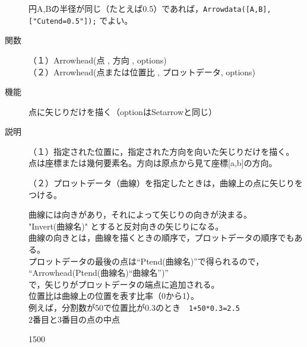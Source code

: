 \documentclass[papersize,a4paper,10pt,uplatex]{jsarticle}
\begin{document}
\begin{description}
円A,Bの半径が同じ（たとえば0.5）であれば，\verb|Arrowdata([A,B],["Cutend=0.5"]);| でよい。

\vspace{\baselineskip}
\hypertarget{arrowhead}{}
\item[関数]（１）Arrowhead(点 , 方向 , options)\\
（２）Arrowhead(点または位置比 , プロットデータ, options)
\item[機能]点に矢じりだけを描く（optionはSetarrowと同じ）
\item[説明]（１）指定された位置に，指定された方向を向いた矢じりだけを描く。\\
\hspace*{2.5zw}点は座標または幾何要素名。方向は原点から見て座標[a,b]の方向。


（２）プロットデータ（曲線）を指定したときは，曲線上の点に矢じりをつける。

\hspace*{2.5zw}曲線には向きがあり，それによって矢じりの向きが決まる。\\
\hspace*{2.5zw}"Invert(曲線名)" とすると反対向きの矢じりになる。\\
\hspace*{2.5zw}曲線の向きとは，曲線を描くときの順序で，プロットデータの順序でもある。\\
\hspace*{2.5zw}プロットデータの最後の点は``Ptend(曲線名)''で得られるので，
``Arrowhead(Ptend(曲線名)``曲線名'')''\\
\hspace*{2.5zw}で，矢じりがプロットデータの端点に追加される。\\
\hspace*{2.5zw}位置比は曲線上の位置を表す比率（0から1）。\\
\hspace*{3.5zw}例えば，分割数が50で位置比が0.3のとき　\verb|1+50*0.3=2.5|\\
\hspace*{4.5zw}2番目と3番目の点の中点



\vspace{0.5zw}

\begin{layer}{150}{0}
\end{layer}


\end{description}
\end{document}
